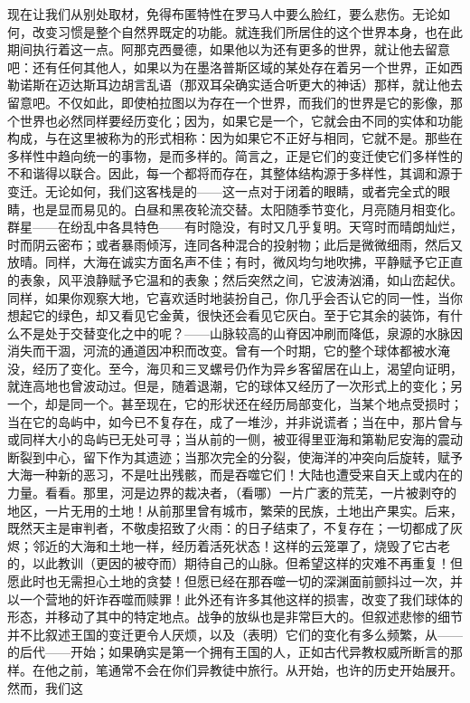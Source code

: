 现在让我们从别处取材，免得布匿特性在罗马人中要么脸红，要么悲伤。无论如何，改变习惯是整个自然界既定的功能。就连我们所居住的这个世界本身，也在此期间执行着这一点。阿那克西曼德，如果他以为还有更多的世界，就让他去留意吧：还有任何其他人，如果以为在墨洛普斯区域的某处存在着另一个世界，正如西勒诺斯在迈达斯耳边胡言乱语（那双耳朵确实适合听更大的神话）那样，就让他去留意吧。不仅如此，即使柏拉图以为存在一个世界，而我们的世界是它的影像，那个世界也必然同样要经历变化；因为，如果它是一个，它就会由不同的实体和功能构成，与在这里被称为的形式相称：因为如果它不正好与相同，它就不是。那些在多样性中趋向统一的事物，是而多样的。简言之，正是它们的变迁使它们多样性的不和谐得以联合。因此，每一个都将而存在，其整体结构源于多样性，其调和源于变迁。无论如何，我们这客栈是的——这一点对于闭着的眼睛，或者完全式的眼睛，也是显而易见的。白昼和黑夜轮流交替。太阳随季节变化，月亮随月相变化。群星——在纷乱中各具特色——有时隐没，有时又几乎复明。天穹时而晴朗灿烂，时而阴云密布；或者暴雨倾泻，连同各种混合的投射物；此后是微微细雨，然后又放晴。同样，大海在诚实方面名声不佳；有时，微风均匀地吹拂，平静赋予它正直的表象，风平浪静赋予它温和的表象；然后突然之间，它波涛汹涌，如山峦起伏。同样，如果你观察大地，它喜欢适时地装扮自己，你几乎会否认它的同一性，当你想起它的绿色，却又看见它金黄，很快还会看见它灰白。至于它其余的装饰，有什么不是处于交替变化之中的呢？——山脉较高的山脊因冲刷而降低，泉源的水脉因消失而干涸，河流的通道因冲积而改变。曾有一个时期，它的整个球体都被水淹没，经历了变化。至今，海贝和三叉螺号仍作为异乡客留居在山上，渴望向证明，就连高地也曾波动过。但是，随着退潮，它的球体又经历了一次形式上的变化；另一个，却是同一个。甚至现在，它的形状还在经历局部变化，当某个地点受损时；当在它的岛屿中，如今已不复存在，成了一堆沙，并非说谎者；当在中，那片曾与或同样大小的岛屿已无处可寻；当从前的一侧，被亚得里亚海和第勒尼安海的震动断裂到中心，留下作为其遗迹；当那次完全的分裂，使海洋的冲突向后旋转，赋予大海一种新的恶习，不是吐出残骸，而是吞噬它们！大陆也遭受来自天上或内在的力量。看看。那里，河是边界的裁决者，（看哪）一片广袤的荒芜，一片被剥夺的地区，一片无用的土地！从前那里曾有城市，繁荣的民族，土地出产果实。后来，既然天主是审判者，不敬虔招致了火雨：的日子结束了，不复存在；一切都成了灰烬；邻近的大海和土地一样，经历着活死状态！这样的云笼罩了，烧毁了它古老的，以此教训（更因的被夺而）期待自己的山脉。但希望这样的灾难不再重复！但愿此时也无需担心土地的贪婪！但愿已经在那吞噬一切的深渊面前颤抖过一次，并以一个营地的奸诈吞噬而赎罪！此外还有许多其他这样的损害，改变了我们球体的形态，并移动了其中的特定地点。战争的放纵也是非常巨大的。但叙述悲惨的细节并不比叙述王国的变迁更令人厌烦，以及（表明）它们的变化有多么频繁，从——的后代——开始；如果确实是第一个拥有王国的人，正如古代异教权威所断言的那样。在他之前，笔通常不会在你们异教徒中旅行。从开始，也许的历史开始展开。然而，我们这
